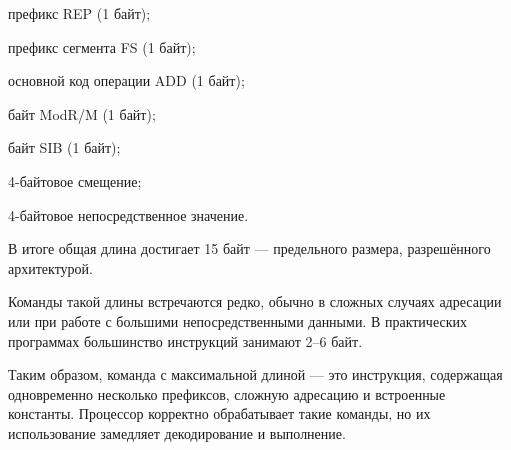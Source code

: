 префикс REP (1 байт);

префикс сегмента FS (1 байт);

основной код операции ADD (1 байт);

байт ModR/M (1 байт);

байт SIB (1 байт);

4-байтовое смещение;

4-байтовое непосредственное значение.

В итоге общая длина достигает 15 байт — предельного размера, разрешённого архитектурой.

Команды такой длины встречаются редко, обычно в сложных случаях адресации или при работе с большими непосредственными данными. В практических программах большинство инструкций занимают 2–6 байт.

Таким образом, команда с максимальной длиной — это инструкция, содержащая одновременно несколько префиксов, сложную адресацию и встроенные константы. Процессор корректно обрабатывает такие команды, но их использование замедляет декодирование и выполнение.

\endinput
